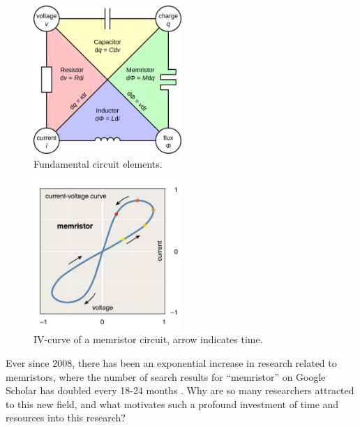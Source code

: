 \begin{figure}[htbp]
	\begin{center}
		\includegraphics[width=0.5\textwidth]{inc/circuit_elements.png}
		\caption{Fundamental circuit elements.\protect\footnotemark}
		\label{fig:circuit_elements}
	\end{center}
\end{figure}

\begin{figure}[htbp]
	\begin{center}
		\includegraphics[width=0.5\textwidth]{inc/pinched_hysteresis.png}
		\caption{IV-curve of a memristor circuit, arrow indicates time.\protect\footnotemark}
		\label{fig:pinched_hysteresis}
	\end{center}
\end{figure}

Ever since 2008, there has been an exponential increase in research related to memristors, where the number of search results for ``memristor'' on Google Scholar has doubled every 18-24 months \cite{memristors_a_new_frontier}. Why are so many researchers attracted to this new field, and what motivates such a profound investment of time and resources into this research?

